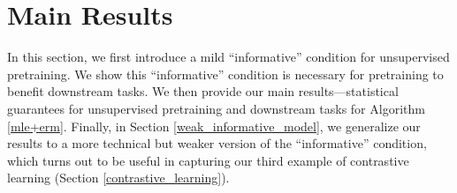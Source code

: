 \section{Main Results}\label{main_results}
In this section, we first introduce a mild ``informative'' condition for unsupervised pretraining. We show this ``informative'' condition is necessary for pretraining to benefit downstream tasks. We then provide our main results---statistical guarantees for unsupervised pretraining and downstream tasks for Algorithm \ref{mle+erm}. Finally, in Section \ref{weak_informative_model}, we generalize our results to a more technical but weaker version of the ``informative'' condition, which turns out to be useful in capturing our third example of contrastive learning (Section \ref{contrastive_learning}).






